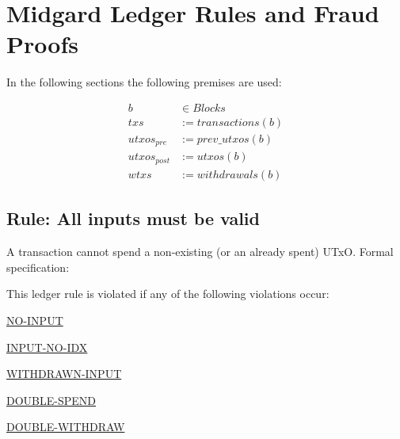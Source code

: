 \documentclass[../midgard.tex]{subfiles}
\begin{document}
\newcommand*\ledgerRuleBox[1]{%
\colorbox{ledgerRuleGreen}{\hspace{1em}#1\hspace{1em}}}

\section{Midgard Ledger Rules and Fraud Proofs}
\label{h:ledger-rules-fraud-proofs}

In the following sections the following premises are used:

\begin{equation*}
\begin{split}
           b & \in Blocks          \\
         txs & := transactions(b)  \\
 utxos_{pre} & := prev\_utxos(b)   \\
utxos_{post} & := utxos(b)         \\
        wtxs & := withdrawals(b)
\end{split}
\end{equation*}

\subsection{Rule: All inputs must be valid}
\label{rule:all-inputs-must-be-valid}

A transaction cannot spend a non-existing (or an already spent) UTxO. Formal specification:

This ledger rule is violated if any of the following violations occur:
\begin{itemize-multi}
  \item \hyperref[violation:NO-INPUT]{NO-INPUT}
  \item \hyperref[violation:INPUT-NO-IDX]{INPUT-NO-IDX}
  \item \hyperref[violation:WITHDRAWN-INPUT]{WITHDRAWN-INPUT}
  \item \hyperref[violation:DOUBLE-SPEND]{DOUBLE-SPEND}
  \item \hyperref[violation:DOUBLE-WITHDRAW]{DOUBLE-WITHDRAW}
\end{itemize-multi}
\end{document}
